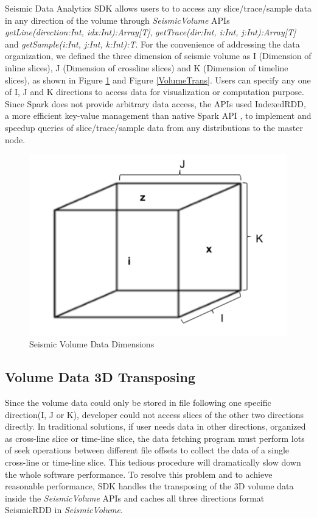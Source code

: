 Seismic Data Analytics SDK allows users to to access any slice/trace/sample data in any direction of the volume through \emph{SeismicVolume} APIs \emph{getLine(direction:Int, idx:Int):Array[T]}, \emph{getTrace(dir:Int, i:Int, j:Int):Array[T]} and \emph{getSample(i:Int, j:Int, k:Int):T}. 
For the convenience of addressing the data organization, we defined the three dimension of seismic volume as I (Dimension of inline slices), J (Dimension of crossline slices) and K (Dimension of timeline slices), as shown in Figure \ref{VolumeDim} and Figure \ref{VolumeTrans}. Users can specify any one of I, J and K directions to access data for visualization or computation purpose. Since Spark does not provide arbitrary data access, the APIs used IndexedRDD, a more efficient key-value management than native Spark API \cite{IndexedRDD}, to implement and speedup queries of slice/trace/sample data from any distributions to the master node.

\begin{figure}[h]
\centering
\includegraphics[scale=0.6]{figures/VolumeDim.png}
\caption{Seismic Volume Data Dimensions}
\label{VolumeDim}
\end{figure}


\subsection{Volume Data 3D Transposing}

Since the volume data could only be stored in file following one specific direction(I, J or K), developer could not access slices of the other two directions directly. In traditional solutions, if user needs data in other directions, organized as cross-line slice or time-line slice, the data fetching program must perform lots of seek operations between different file offsets to collect the data of a single cross-line or time-line slice. This tedious procedure will dramatically slow down the whole software performance. To resolve this problem and to achieve reasonable performance, SDK handles the transposing of the 3D volume data inside the \emph{SeismicVolume} APIs and caches all three directions format SeismicRDD in \emph{SeismicVolume}.

